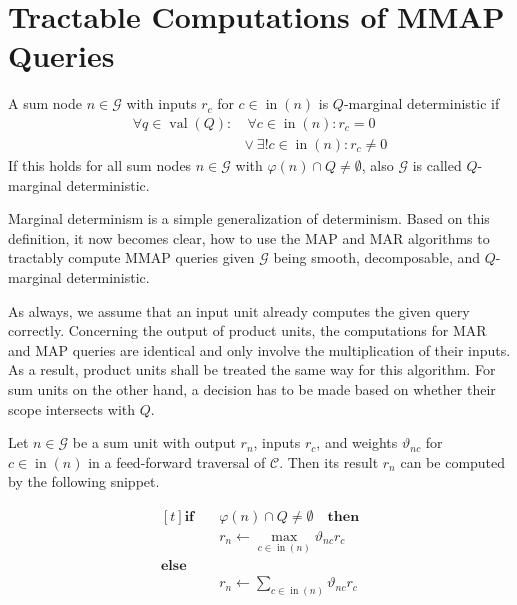 \documentclass[9pt,fleqn,twoside,twocolumn]{stdglobal}
\DeclareMathOperator{\val}{val}
\DeclareMathOperator{\nodein}{in}
\begin{document}
\section{Tractable Computations of MMAP Queries}
  \begin{definition*}
    A sum node $n\in\mathscr{G}$ with inputs $r_c$ for $c\in\nodein(n)$ is $Q$-marginal deterministic if
    \begin{align*}
      \forall q\in\val(Q):
      &\ \forall c\in\nodein(n): r_c = 0 \\
      &\vee\ \exists! c\in\nodein(n): r_c \neq 0
    \end{align*}
    If this holds for all sum nodes $n\in\mathscr{G}$ with $φ(n)\cap Q\neq\emptyset$, also $\mathscr{G}$ is called $Q$-marginal deterministic.
  \end{definition*}
  \vspace{-0.1em}
  \noindent
  Marginal determinism is a simple generalization of determinism.
  Based on this definition, it now becomes clear, how to use the MAP and MAR algorithms to tractably compute MMAP queries given $\mathscr{G}$ being smooth, decomposable, and $Q$-marginal deterministic.

  As always, we assume that an input unit already computes the given query correctly.
  Concerning the output of product units, the computations for MAR and MAP queries are identical and only involve the multiplication of their inputs.
  As a result, product units shall be treated the same way for this algorithm.
  For sum units on the other hand, a decision has to be made based on whether their scope intersects with $Q$.

  Let $n\in\mathscr{G}$ be a sum unit with output $r_n$, inputs $r_c$, and  weights $ϑ_{nc}$ for $c\in\nodein(n)$ in a feed-forward traversal of $\mathscr{C}$.
  Then its result $r_n$ can be computed by the following snippet.
  \medskip
  \begin{tcolorbox}[%
    colframe=black,
    colbacktitle=white,
    coltitle=black,
    colback=mathdefback,
    attach boxed title to top center={yshift=-2mm},
    enhanced,
    titlerule=0.1pt,
    boxrule=0.5pt,
    arc=5pt,
    breakable,
    title=Sum Unit Computation for MMAP Algorithm
  ]
    \vspace{-1em}
    \[
      \begin{aligned}[t]
        \mathbf{if}\quad &φ(n) \cap Q \neq \emptyset \quad \mathbf{then} \\
        & r_n \longleftarrow \max_{c\in\nodein(n)} ϑ_{nc}r_c \\
        \mathbf{else} \\
        & r_n \longleftarrow \sum_{c\in\nodein(n)} ϑ_{nc}r_c
      \end{aligned}
    \]
  \end{tcolorbox}
\end{document}
